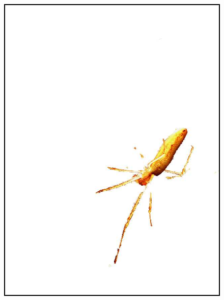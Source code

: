 \begin{figure}
{\includegraphics[scale=0.15]{figures/chapter3/grabcut-connectivity/cp-2.png}
}
\subfloat[]{
}
\end{figure}
